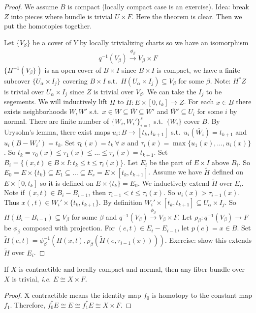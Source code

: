 \documentclass[12pt,class=article,crop=false]{standalone}
\begin{document}
\begin{proof}
We assume $ B$ is compact (locally compact case is an exercise). Idea: break  $ Z$ into pieces where bundle is trivial  $ U \times F$. Here the theorem is clear. Then we put the homotopies together.

Let $ \{V_{ \beta}\} $ be a cover of $ Y$ by locally trivializing charts so we have an isomorphism
 \begin{align*}
	q^{-1}(V_{ \beta}) \xrightarrow{ \phi _{ \beta}}  V_{ \beta} \times F
\end{align*}
$ \{H ^{-1}(V _{ \beta}\}) $ is an open cover of $ B \times I$ since $ B \times I$ is compact, we have a finite subcover $ \{U _{ \alpha} \times I_j\} $ covering $ B \times I$ s.t.\ $ H(U_{ \alpha} \times I_j) \subseteq V_{ \beta}$ for some $ \beta$. Note: $ H^* Z$ is trivial over $ U_{ \alpha} \times I_j$ since $ Z$ is trivial over  $ V_{ \beta}$. We can take the $ I_j$ to be segements. We will inductively lift $ H$ to  $ \widetilde{ H}: E \times [0,t_{k}] \to Z$. For each $ x \in B$ there exists neighborhoods  $ W,W'$  s.t.\ $ x \in W \subseteq \overline{W} \subseteq W'$ and $ \overline{W}' \subseteq U_i$ for some $ i$ by normal. There are finite number of $ \{W_i,W_i'\}_{i=1}^{s} $ s.t.\ $ \{W_i\} $ cover $ B$. By Urysohn's lemma, there exist maps  $ u_i: B \to [t_k,t_{k+1}]$ s.t.\ $ u_i(\overline{W}_i) = t_{k+1}$ and $ u_i(B - W_i') = t_k$. Set $ \tau_0(x) = t_k \ \forall \ x$ and $ \tau_i(x) = \max \{u_1(x),\ldots,u_i(x)\} $. So $ t_k = \tau_0(x) \leq \tau_1(x) \leq \ldots\leq \tau_s(x) = t_{k+1}$. Set $ B_i = \{(x,t) \in B \times I: t_k \leq t \leq \tau_i(x)\} $. Let $ E_i$ be the part of $ E \times I$ above $ B_i$. So $ E_0= E \times \{t_k\} \subseteq E_1 \subseteq \ldots \subseteq E_s = E \times [t_k, t_{k+1}]$. Assume we have $ \widetilde{ H}$ defined on $ E \times [0,t_k]$ so it is defined on $ E \times \{t_k\} = E_0$. We inductively extend $ \widetilde{ H}$ over $ E_i$. Note if $ (x,t) \in B_i - B_{i-1}$, then $ \tau_{i-1} < t \leq \tau_i(x)$. So $ u_i(x) > \tau_{i-1}(x)$. Thus $ x(,t) \in W_i' \times \{t_k,t_{k+1}\} $. By definition $ W_i' \times [t_k,t_{k+1}] \subseteq U_{ \alpha} \times I_j$. So $ H(B_i-B_{i-1}) \subseteq V_ \beta$ for some $ \beta$ and $ q^{-1}(V_ \beta) \xrightarrow{ \phi_{ \beta}} V_{ \beta} \times F$. Let $ \rho_{ \beta}: q^{-1}(V_{ \beta}) \to F$ be $ \phi_{ \beta}$ composed with projection. For $ (e,t) \in E_i - E_{i-1}$, let $ p(e) = x \in B$. Set $ \widetilde{ H}(e,t) = \phi_{ \beta}^{-1}(H(x,t), \rho_{ \beta}(\widetilde{ H}(e, \tau_{i-1}(x))))$. Exercise: show this extends $ \widetilde{ H}$ over $ E_i$.
\end{proof}

\begin{coro}
If $ X$ is contractible and locally compact and normal, then any fiber bundle over  $ X$ is trivial,  \emph{i.e.} $ E \cong X \times F$.
\end{coro}
\begin{proof}
X contractible means the identity map $ f_0$ is homotopy to the constant map $ f_1$. Therefore, $ f_0^* E \cong E \cong f_1^* E \cong X \times F $.
\end{proof}
\end{document}

